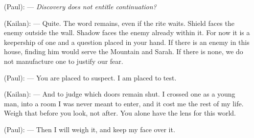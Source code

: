 \begin{room}
(Paul): --- \textit{Discovery does not entitle continuation?}

(Kailan): --- Quite. The word remains, even if the rite waits. Shield faces the enemy outside the wall. Shadow faces the enemy already within it. For now it is a keepership of one and a question placed in your hand. If there is an enemy in this house, finding him would serve the Mountain and Sarah. If there is none, we do not manufacture one to justify our fear.

(Paul): --- You are placed to suspect. I am placed to test.

(Kailan): --- And to judge which doors remain shut. I crossed one as a young man, into a room I was never meant to enter, and it cost me the rest of my life. Weigh that before you look, not after. You alone have the lens for this world.

(Paul): --- Then I will weigh it, and keep my face over it.

\end{room}
